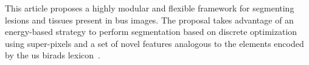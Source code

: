 %

This article proposes a highly modular and flexible framework for segmenting lesions and tissues present in \ac{bus} images.
The proposal takes advantage of an energy-based strategy to perform segmentation based on discrete optimization using super-pixels and a set of novel features analogous to the elements encoded by the \ac{us} \ac{birads} lexicon~\cite{biradsus}.

